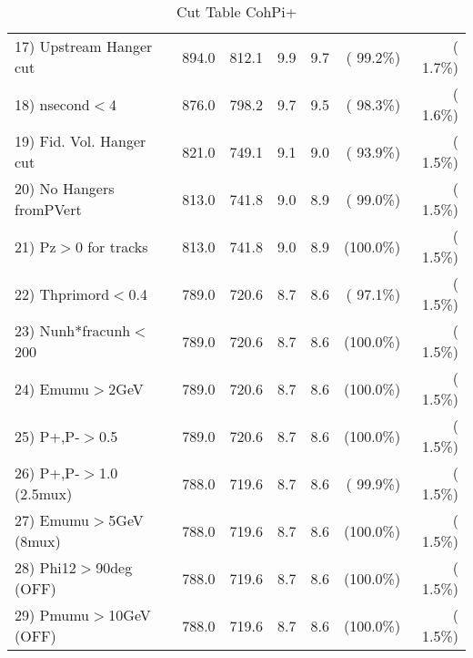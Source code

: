 \begin{table}[h!]
\begin{tabular}{||l||r|r|r|r|r|r||}
 17) Upstream Hanger cut  &        894.0 &        812.1 &          9.9 &          9.7 & ( 99.2\%) & (  1.7\%) \\
 18) nsecond$<$4          &        876.0 &        798.2 &          9.7 &          9.5 & ( 98.3\%) & (  1.6\%) \\
 19) Fid. Vol. Hanger cut &        821.0 &        749.1 &          9.1 &          9.0 & ( 93.9\%) & (  1.5\%) \\
 20) No Hangers fromPVert &        813.0 &        741.8 &          9.0 &          8.9 & ( 99.0\%) & (  1.5\%) \\
 21) Pz$>$0 for tracks    &        813.0 &        741.8 &          9.0 &          8.9 & (100.0\%) & (  1.5\%) \\
 22) Thprimord$<$0.4      &        789.0 &        720.6 &          8.7 &          8.6 & ( 97.1\%) & (  1.5\%) \\
 23) Nunh*fracunh$<$200   &        789.0 &        720.6 &          8.7 &          8.6 & (100.0\%) & (  1.5\%) \\
 24) Emumu$>$2GeV         &        789.0 &        720.6 &          8.7 &          8.6 & (100.0\%) & (  1.5\%) \\
 25) P+,P-$>$0.5          &        789.0 &        720.6 &          8.7 &          8.6 & (100.0\%) & (  1.5\%) \\
 26) P+,P-$>$1.0 (2.5mux) &        788.0 &        719.6 &          8.7 &          8.6 & ( 99.9\%) & (  1.5\%) \\
 27) Emumu$>$5GeV  (8mux) &        788.0 &        719.6 &          8.7 &          8.6 & (100.0\%) & (  1.5\%) \\
 28) Phi12$>$90deg  (OFF) &        788.0 &        719.6 &          8.7 &          8.6 & (100.0\%) & (  1.5\%) \\
 29) Pmumu$>$10GeV  (OFF) &        788.0 &        719.6 &          8.7 &          8.6 & (100.0\%) & (  1.5\%) \\
 \hline
 \hline
 \end{tabular}
 \caption{Cut Table  CohPi+   }
 \label{tab-cutcohjpsi-mumu_cohpip}
 \end{table}
